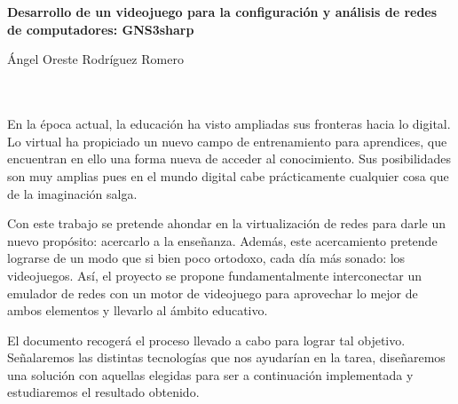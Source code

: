 \chapter*{}






\cleardoublepage
\thispagestyle{empty}

\begin{center}
{\large\bfseries Desarrollo de un videojuego para la configuración y análisis de redes de computadores: GNS3sharp}\\
\end{center}
\begin{center}
Ángel Oreste Rodríguez Romero\\
\end{center}

\\

\vspace{0.7cm}
\\

En la época actual, la educación ha visto ampliadas sus fronteras hacia lo digital. Lo virtual ha propiciado un nuevo campo de entrenamiento para aprendices, que encuentran en ello una forma nueva de acceder al conocimiento. Sus posibilidades son muy amplias pues en el mundo digital cabe prácticamente cualquier cosa que de la imaginación salga.

Con este trabajo se pretende ahondar en la virtualización de redes para darle un nuevo propósito: acercarlo a la enseñanza. Además, este acercamiento pretende lograrse de un modo que si bien poco ortodoxo, cada día más sonado: los videojuegos. Así, el proyecto se propone fundamentalmente interconectar un emulador de redes con un motor de videojuego para aprovechar lo mejor de ambos elementos y llevarlo al ámbito educativo.

El documento recogerá el proceso llevado a cabo para lograr tal objetivo. Señalaremos las distintas tecnologías que nos ayudarían en la tarea, diseñaremos una solución con aquellas elegidas para ser a continuación implementada y estudiaremos el resultado obtenido.

\cleardoublepage


